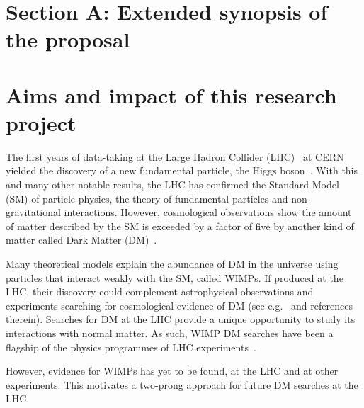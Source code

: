 \documentclass[11pt,a4paper]{article}
\begin{document}
\clearpage

\section*{Section A: Extended synopsis of the proposal} 

\medskip

\section{Aims and impact of this research project} 
\smallskip


The first years of data-taking at the Large Hadron Collider (LHC)~\cite{LHC2008} at CERN yielded the discovery of a new fundamental particle, the Higgs boson~\cite{Khachatryan:2016vau}. With this and many other notable results, the LHC has confirmed the Standard Model (SM) of particle physics, the theory of fundamental particles and non-gravitational interactions. 
However, cosmological observations show the amount of matter described by the SM is exceeded by a factor of five by another kind of matter called Dark Matter (DM)~\cite{Bertone:2016nfn}. 

Many theoretical models explain the abundance of DM in the universe using particles that interact weakly with the SM, called WIMPs. 
If produced at the LHC, their discovery could complement astrophysical observations and experiments searching for cosmological evidence of DM (see e.g.~\cite{Boveia:2018yeb} and references therein). 
Searches for DM at the LHC provide a unique opportunity to study its interactions with normal matter. 
As such, WIMP DM searches have been a flagship of the physics programmes of LHC experiments~\cite{Boveia:2018yeb,Aaboud:2019yqu,Canepa:2019hph}. 

However, evidence for WIMPs has yet to be found, at the LHC and at other experiments. This motivates a two-prong approach for future DM searches at the LHC. 
\end{document}
